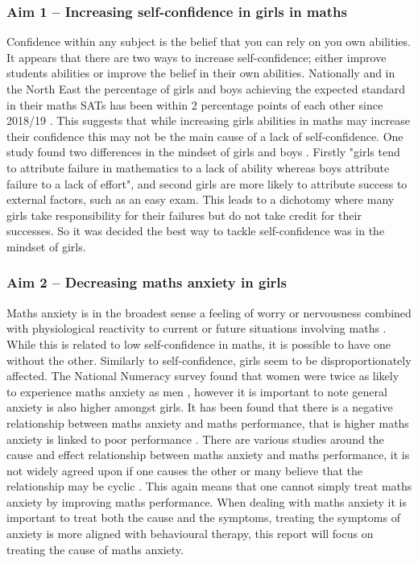 \documentclass[11pt, a4paper, notitlepage]{article}
\begin{document}
\subsubsection*{Aim 1 -- Increasing self-confidence in girls in maths} 
Confidence within any subject is the belief that you can rely on you own abilities. It appears that there are two ways to increase self-confidence; either improve students abilities or improve the belief in their own abilities. Nationally and in the North East the percentage of girls and boys achieving the expected standard in their maths SATs has been within 2 percentage points of each other since 2018/19 \cite{maths_SATs_stats}. This suggests that while increasing girls abilities in maths may increase their confidence this may not be the main cause of a lack of self-confidence. One study  found two differences in the mindset of girls and boys \cite{Georgiou01122007}. Firstly "girls tend to attribute failure in mathematics to a lack of ability whereas boys attribute failure to a lack of effort", and second girls are more likely to attribute success to external factors, such as an easy exam. This leads to a dichotomy where many girls take responsibility for their failures but do not take credit for their successes. So it was decided the best way to tackle self-confidence was in the mindset of girls.
\subsubsection*{Aim 2 -- Decreasing maths anxiety in girls}
Maths anxiety is in the broadest sense a feeling of worry or nervousness combined with physiological reactivity to current or future situations involving maths \cite{Luttenberger:2018}. While this is related to low self-confidence in maths, it is possible to have one without the other. Similarly to self-confidence, girls seem to be disproportionately affected. The National Numeracy survey found that women were twice as likely to experience maths anxiety as men \cite{NationalNumeracy_anxiety}, however it is important to note general anxiety is also higher amongst girls. It has been found that there is a negative relationship between maths anxiety and maths performance, that is higher maths anxiety is linked to poor performance \cite{Chang:2016}. 
There are various studies around the cause and effect relationship between maths anxiety and maths performance, it is not widely agreed upon if one causes the other or many believe that the relationship may be cyclic \cite{Chang:2016}. This again means that one cannot simply treat maths anxiety by improving maths performance. When dealing with maths anxiety it is important to treat both the cause and the symptoms, treating the symptoms of anxiety is more aligned with behavioural therapy, this report will focus on treating the cause of maths anxiety.
\end{document}
